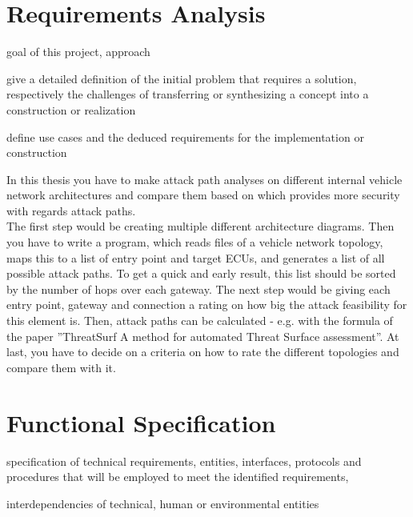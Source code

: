 \chapter{Requirements Analysis}
\label{chp:requirements}


\begin{shaded}
\noindent
goal of this project, approach

\medskip
\noindent
give a detailed definition of the initial problem that requires a solution, 
respectively the challenges of transferring or synthesizing a concept into a construction or realization

\medskip
\noindent
define use cases and the deduced requirements for the implementation or construction
\end{shaded}

In this thesis you have to make attack path analyses on different internal vehicle network architectures and compare them
based on which provides more security with regards attack
paths.\\

The first step would be creating multiple different architecture diagrams. Then you have to write a program, which reads
files of a vehicle network topology, maps this to a list of entry point and target ECUs, and generates a list of all possible
attack paths. To get a quick and early result, this list should
be sorted by the number of hops over each gateway. The next
step would be giving each entry point, gateway and connection a rating on how big the attack feasibility for this element
is. Then, attack paths can be calculated - e.g. with the formula
of the paper ”ThreatSurf A method for automated Threat Surface assessment”. At last, you have to decide on a criteria on
how to rate the different topologies and compare them with
it.


\chapter{Functional Specification}
\label{chp:specification}


\begin{shaded}
\noindent
specification of technical requirements, entities, interfaces, protocols and procedures that will be employed to meet the identified requirements,

\medskip
\noindent
interdependencies of technical, human or environmental entities
\end{shaded}
